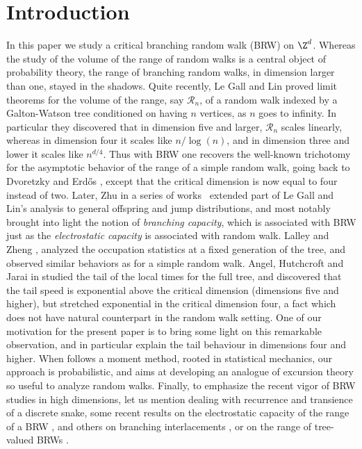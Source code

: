 \section{Introduction}\label{sec-intro}
In this paper we study a critical branching random walk (BRW) on $\Z^d$.
Whereas the study of the volume of the range of random walks is a central
object of probability theory, the range of branching random walks,
in dimension larger than one, stayed in the shadows.
Quite recently, Le Gall and Lin \cite{LGL1,LGL2} proved limit theorems
for the volume of the range, say $\mathcal R_n$, of a random walk indexed by a Galton-Watson tree
conditioned on having $n$ vertices, as $n$ goes
to infinity.
In particular they discovered that in dimension five and larger,
$\mathcal R_n$
scales linearly, whereas in dimension four it scales like
$n/\log(n)$, and in dimension three and lower it scales
like $n^{d/4}$. Thus with BRW one recovers the well-known trichotomy for the asymptotic behavior of the range
of a simple random walk, going back to Dvoretzky and Erd\H{o}s \cite{DE}, except that
the critical dimension is now equal to four instead of two.
Later, Zhu in a series of works~\cite{Zhu1,Zhu2,Zhu4,Zhu3} extended part of Le Gall and Lin's analysis to general offspring and jump distributions,
and most notably brought into light
the notion of {\it branching capacity}, which is associated with
BRW just as the {\it electrostatic capacity}
is associated with random walk.
Lalley and Zheng \cite{LZ11},
analyzed the occupation statistics at a fixed generation of the tree,
and observed similar behaviors as for a simple random walk.
Angel, Hutchcroft and Jarai in \cite{AHJ}
studied the tail of the local times for the full tree, and
discovered that the tail speed is
exponential above the critical dimension (dimensions five and higher), but
stretched exponential in the critical dimension four, a fact which does not have natural counterpart in the random walk setting.
One of our motivation for the present paper
is to bring some light on this remarkable observation, and in particular
explain the tail behaviour in dimensions four and higher.
When \cite{AHJ} follows a moment method, rooted in statistical mechanics,
our approach is probabilistic, and aims at developing an analogue of
excursion theory so useful to analyze random walks. Finally, to
emphasize the recent vigor of BRW studies in high dimensions,
let us mention \cite{BC12,LSS24} dealing with recurrence and transience of a discrete snake, some recent results
on the electrostatic capacity of the range of a BRW \cite{BW20,BH21,BH22},
and others on branching interlacements \cite{PZ19,Zhu18}, or on the range of tree-valued BRWs \cite{DKLT}.

